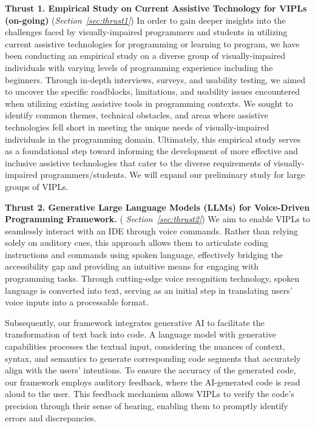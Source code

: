 \vspace{3pt}
\noindent \textbf{Thrust 1. Empirical Study on Current Assistive
  Technology for VIPLs (on-going)} ({\em Section~\ref{sec:thrust1}})
In order to gain deeper insights into the challenges faced by
visually-impaired programmers and students in utilizing current
assistive technologies for programming or learning to program, we have
been conducting an empirical study on a diverse group of
visually-impaired individuals with varying levels of programming
experience including the beginners. Through in-depth interviews,
surveys, and usability testing, we aimed to uncover the specific
roadblocks, limitations, and usability issues encountered when
utilizing existing assistive tools in programming contexts.
We sought to identify common themes, technical obstacles, and areas
where assistive technologies fell short in meeting the unique needs of
visually-impaired individuals in the programming domain. Ultimately,
this empirical study serves as a foundational step toward informing
the development of more effective and inclusive assistive technologies
that cater to the diverse requirements of visually-impaired
programmers/students. We will expand our preliminary study
for large groups of VIPLs.

\noindent \textbf{Thrust 2. Generative Large Language Models (LLMs)
  for Voice-Driven Programming Framework.}  ({\em
  Section~\ref{sec:thrust2}})
We aim to enable VIPLs to seamlessly interact with an IDE through
voice commands. Rather than relying solely on auditory cues, this
approach allows them to articulate coding instructions and commands
using spoken language, effectively bridging the accessibility gap and
providing an intuitive means for engaging with programming
tasks. Through cutting-edge voice recognition technology, spoken
language is converted into text, serving as an initial step in
translating users' voice inputs into a processable format.

Subsequently, our framework integrates generative AI to facilitate the
transformation of text back into code. A language model with
generative capabilities processes the textual input, considering the
nuances of context, syntax, and semantics to generate corresponding
code segments that accurately align with the users' intentions. To
ensure the accuracy of the generated code, our framework employs
auditory feedback, where the AI-generated code is read aloud to the
user. This feedback mechanism allows VIPLs to verify the code's
precision through their sense of hearing, enabling them to promptly
identify errors and discrepancies.

